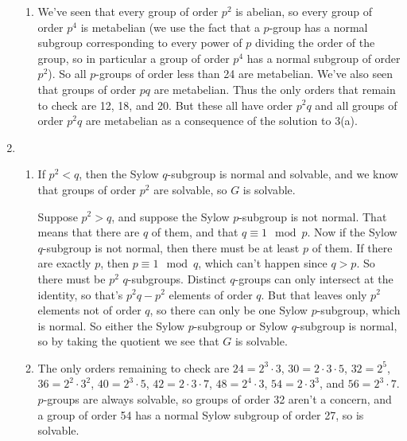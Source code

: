 \documentclass{article}
\begin{document}
\begin{enumerate}
\begin{enumerate}
         \item We've seen that every group of order $p^2$ is abelian, so every
            group of order $p^4$ is metabelian (we use the fact that a $p$-group
            has a normal subgroup corresponding to every power of $p$ dividing
            the order of the group, so in particular a group of order $p^4$ has
            a normal subgroup of order $p^2$). So all $p$-groups of order less
            than 24 are metabelian. We've also seen that groups of order $pq$
            are metabelian. Thus the only orders that remain to check are 12,
            18, and 20. But these all have order $p^2q$ and all groups of order
            $p^2q$ are metabelian as a consequence of the solution to 3(a).

      \end{enumerate}

   \item
      \begin{enumerate}

         \item If $p^2 < q$, then the Sylow $q$-subgroup is normal and solvable,
            and we know that groups of order $p^2$ are solvable, so $G$ is
            solvable.

            Suppose $p^2 > q$, and suppose the Sylow $p$-subgroup is not normal.
            That means that there are $q$ of them, and that $q \equiv 1 \mod p$.
            Now if the Sylow $q$-subgroup is not normal, then there must be at
            least $p$ of them. If there are exactly $p$, then $p \equiv 1 \mod
            q$, which can't happen since $q > p$. So there must be $p^2$
            $q$-subgroups. Distinct $q$-groups can only intersect at the
            identity, so that's $p^2q - p^2$ elements of order $q$. But that
            leaves only $p^2$ elements not of order $q$, so there can only be
            one Sylow $p$-subgroup, which is normal. So either the Sylow
            $p$-subgroup or Sylow $q$-subgroup is normal, so by taking the
            quotient we see that $G$ is solvable.

         \item The only orders remaining to check are $24 = 2^3\cdot3$, $30 =
            2\cdot3\cdot5$, $32 = 2^5$, $36 = 2^2\cdot3^2$, $40=2^3\cdot5$, $42
            = 2\cdot3\cdot7$, $48 = 2^4\cdot3$, $54=2\cdot3^3$, and
            $56=2^3\cdot7$. $p$-groups are always solvable, so groups of order
            32 aren't a concern, and a group of order 54 has a normal Sylow
            subgroup of order 27, so is solvable.


\end{enumerate}
\end{enumerate}
\end{document}
